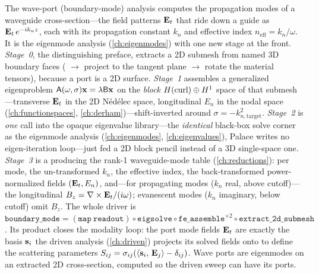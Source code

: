 \summarysection
The wave-port (boundary-mode) analysis computes the propagation modes of a
waveguide cross-section---the field patterns $\mathbf{E}_t$ that ride down a guide as
$\mathbf{E}_t\,e^{-ik_n z}$, each with its propagation constant $k_n$ and effective index
$n_\text{eff}=k_n/\omega$. It is the eigenmode analysis (\cref{ch:eigenmodes}) with
one new stage at the front. \emph{Stage~0}, the distinguishing preface, extracts a
2D submesh from named 3D boundary faces ( $\to$ project to
the tangent plane $\to$ rotate the material tensors), because a port is a 2D
surface. \emph{Stage~1} assembles a generalized eigenproblem
$\mathsf{A}(\omega,\sigma)\mathbf{x}=\lambda\mathsf{B}\mathbf{x}$ on the \emph{block}
$H(\mathrm{curl})\oplus H^1$ space of that submesh---transverse $\mathbf{E}_t$ in the 2D Nédélec
space, longitudinal $E_n$ in the nodal space (\cref{ch:functionspaces},
\cref{ch:derham})---shift-inverted around $\sigma=-k_{n,\text{target}}^2$.
\emph{Stage~2} is \emph{one}  call into the opaque eigenvalue
library---the \emph{identical} black-box solve corner as the eigenmode analysis
(\cref{ch:eigenmodes}, \cref{ch:eigenvalues}), Palace writes no eigen-iteration
loop---just fed a 2D block pencil instead of a 3D single-space one. \emph{Stage~3}
is a  producing the rank-1 waveguide-mode table (\cref{ch:reductions}):
per mode, the un-transformed $k_n$, the effective index, the back-transformed
power-normalized fields $(\mathbf{E}_t,E_n)$, and---for propagating modes
($k_n$ real, above cutoff)---the longitudinal $B_z=\nabla\times\mathbf{E}_t/(i\omega)$; evanescent
modes ($k_n$ imaginary, below cutoff) omit $B_z$. The whole driver is
$\texttt{boundary\_mode}=(\texttt{map}\ \texttt{readout})\circ\texttt{eigsolve}
\circ\texttt{fe\_assemble}^{\times2}\circ\texttt{extract\_2d\_submesh}$. Its product
closes the modality loop: the port mode fields $\mathbf{E}_t$ are exactly the basis
$\mathbf{s}_i$ the driven analysis (\cref{ch:driven}) projects its solved fields onto to
define the scattering parameters $S_{ij}=\sigma_{ij}(\left\langle \mathbf{s}_i,\, \mathbf{E}_j\right\rangle-\delta_{ij})$.
Wave ports are eigenmodes on an extracted 2D cross-section, computed so the driven
sweep can have its ports.

